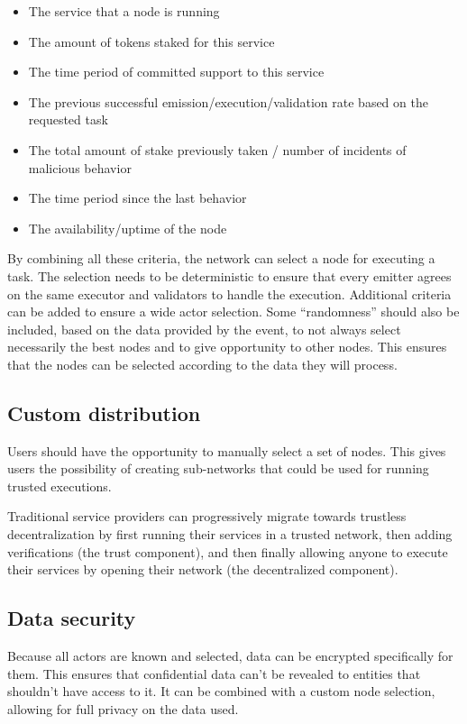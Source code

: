 \documentclass{article}
\begin{document}
\begin{itemize}
\item The service that a node is running
\item The amount of tokens staked for this service
\item The time period of committed support to this service
\item The previous successful emission/execution/validation rate based on the requested task
\item The total amount of stake previously taken / number of incidents of malicious behavior
\item The time period since the last behavior
\item The availability/uptime of the node
\end{itemize}

By combining all these criteria, the network can select a node for executing a task. The selection needs to be deterministic to ensure that every emitter agrees on the same executor and validators to handle the execution. Additional criteria can be added to ensure a wide actor selection. Some “randomness” should also be included, based on the data provided by the event, to not always select necessarily the best nodes and to give opportunity to other nodes. This ensures that the nodes can be selected according to the data they will process.

\subsection{Custom distribution}

Users should have the opportunity to manually select a set of nodes. This gives users the possibility of creating sub-networks that could be used for running trusted executions.

Traditional service providers can progressively migrate towards trustless decentralization by first running their services in a trusted network, then adding verifications (the trust component), and then finally allowing anyone to execute their services by opening their network (the decentralized component).

\subsection{Data security}

Because all actors are known and selected, data can be encrypted specifically for them. This ensures that confidential data can’t be revealed to entities that shouldn’t have access to it. It can be combined with a custom node selection, allowing for full privacy on the data used.
\end{document}
